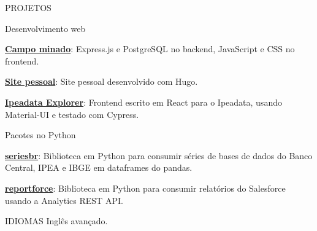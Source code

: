 \documentclass{resume}
\begin{document}
\begin{rSection}{PROJETOS}
  \begin{rSubsection}{Desenvolvimento web}{}{}
  \item
  \item \href{https://github.com/phelipetls/minesweeper.js}{\textbf{Campo
    minado}}: Express.js e PostgreSQL no backend, JavaScript e CSS no
    frontend.
  \item \href{https://phelipetls.github.io}{\textbf{Site pessoal}}: Site pessoal
    desenvolvido com Hugo.
  \item \href{http://ipeadata-explorer.surge.sh}{\textbf{Ipeadata Explorer}}:
    Frontend escrito em React para o Ipeadata, usando Material-UI e testado com
    Cypress.
    \vspace{5mm}
  \end{rSubsection}

  \begin{rSubsection}{Pacotes no Python}{}{}
  \item
  \item \href{https://github.com/phelipetls/seriesbr}{\textbf{seriesbr}}:
    Biblioteca em Python para consumir séries de bases de dados do Banco
    Central, IPEA e IBGE em dataframes do pandas.
  \item \href{https://github.com/phelipetls/reportforce}{\textbf{reportforce}}:
    Biblioteca em Python para consumir relatórios do Salesforce usando a
    Analytics REST API.
    \vspace{5mm}
  \end{rSubsection}
\end{rSection}


\begin{rSection}{IDIOMAS} \itemsep -3pt
    {Inglês avançado.}
\end{rSection}
\end{document}
